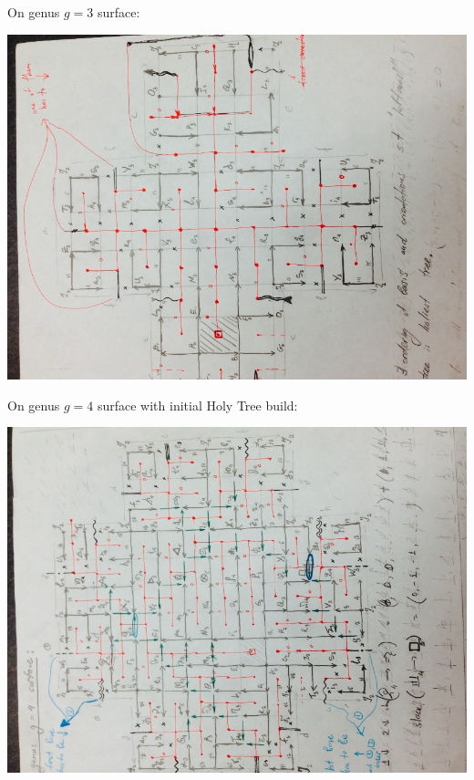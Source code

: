 \documentclass{article}
\begin{document}
\newpage
On genus $g = 3$ surface:
\begin{center}
\includegraphics[angle = -90, scale = 0.7]{genus3.jpg}
\end{center}



\newpage
On genus $g = 4$ surface with initial Holy Tree build:
\begin{center}
\includegraphics[angle = -90, scale = 0.7]{Genus4_InitialHolyTree.jpg}
\end{center}
\end{document}
